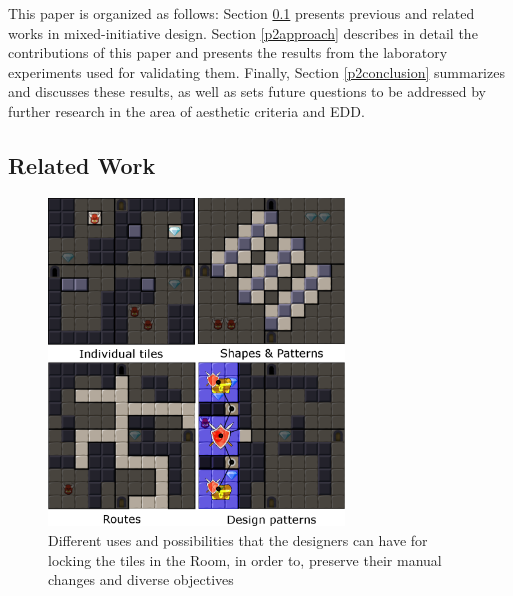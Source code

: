 
This paper is organized as follows: Section \ref{p2background} presents previous and related works in mixed-initiative design. Section \ref{p2approach} describes in detail the contributions of this paper and presents the results from the laboratory experiments used for validating them. Finally, Section \ref{p2conclusion} summarizes and discusses these results, as well as sets future questions to be addressed by further research in the area of aesthetic criteria and EDD.

\subsection{Related Work} \label{p2background}

\begin{figure}
\centering
\includegraphics[width=0.7\textwidth]{included-papers-tex/paper-2/pap2-figures/figure-possible-zones.png}
\caption{Different uses and possibilities that the designers can have for locking the tiles in the Room, in order to, preserve their manual changes and diverse objectives}
\label{p2fig:possible-zones}
\end{figure}


